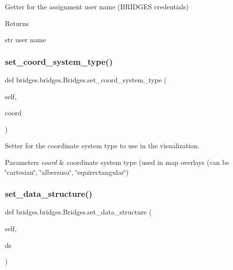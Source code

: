 Getter for the assignment user name (B\+R\+I\+D\+G\+ES credentials) 

\begin{DoxyReturn}{Returns}


str user name 
\end{DoxyReturn}
\mbox{\label{classbridges_1_1bridges_1_1_bridges_a6bc905490b1995234f88f47af9aa8a17}} 
\subsubsection{\texorpdfstring{set\+\_\+coord\+\_\+system\+\_\+type()}{set\_coord\_system\_type()}}
{\footnotesize\ttfamily def bridges.\+bridges.\+Bridges.\+set\+\_\+coord\+\_\+system\+\_\+type (\begin{DoxyParamCaption}\item[{}]{self,  }\item[{}]{coord }\end{DoxyParamCaption})}



Setter for the coordinate system type to use in the visualization. 


\begin{DoxyParams}{Parameters}
{\em coord} & coordinate system type (used in map overlays (can be \char`\"{}cartesian\char`\"{}, \char`\"{}albersusa\char`\"{}, \char`\"{}equirectangular\char`\"{}) \\
\hline
\end{DoxyParams}
\mbox{\label{classbridges_1_1bridges_1_1_bridges_a868f02fa66c87c1a1fc7bd6fbc799291}} 
\subsubsection{\texorpdfstring{set\+\_\+data\+\_\+structure()}{set\_data\_structure()}}
{\footnotesize\ttfamily def bridges.\+bridges.\+Bridges.\+set\+\_\+data\+\_\+structure (\begin{DoxyParamCaption}\item[{}]{self,  }\item[{}]{ds }\end{DoxyParamCaption})}

